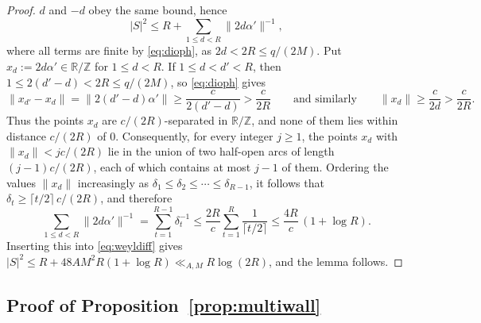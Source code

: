 \documentclass[a4paper,reqno,12pt]{amsart}
\theoremstyle{plain}
\theoremstyle{plain}
\theoremstyle{remark}
\theoremstyle{plain}
\newcommand{\RR}{\mathbb{R}}
\newcommand{\Z}{\mathbb{Z}}
\theoremstyle{plain}
\theoremstyle{plain}
\begin{document}
{\begin{proof}
$d$ and $-d$ obey the same bound, hence
\begin{equation}\label{eq:weyldiff}
|S|^2\leq R+\sum_{1\leq d<R}\|2d\alpha'\|^{-1},
\end{equation}
where all terms are finite by \eqref{eq:dioph}, as $2d<2R\leq q/(2M)$.
Put $x_d:=2d\alpha'\in\RR/\Z$ for $1\leq d<R$. If $1\leq d<d'<R$, then
$1\leq2(d'-d)<2R\leq q/(2M)$, so \eqref{eq:dioph} gives
$$
\|x_{d'}-x_d\|=\|2(d'-d)\alpha'\|\geq\frac{c}{2(d'-d)}>\frac{c}{2R}
\qquad\text{and similarly}\qquad
\|x_d\|\geq\frac{c}{2d}>\frac{c}{2R}.
$$
Thus the points $x_d$ are $c/(2R)$-separated in $\RR/\Z$, and none of them
lies within distance $c/(2R)$ of $0$. Consequently, for every integer
$j\geq1$, the points $x_d$ with $\|x_d\|<jc/(2R)$ lie in the union of two
half-open arcs of length $(j-1)c/(2R)$, each of which contains at most $j-1$
of them. Ordering the values $\|x_d\|$ increasingly as
$\delta_1\leq\delta_2\leq\cdots\leq\delta_{R-1}$, it follows that
$\delta_t\geq\lceil t/2\rceil\,c/(2R)$, and therefore
$$
\sum_{1\leq d<R}\|2d\alpha'\|^{-1}
=\sum_{t=1}^{R-1}\delta_t^{-1}
\leq\frac{2R}{c}\sum_{t=1}^{R}\frac{1}{\lceil t/2\rceil}
\leq\frac{4R}{c}\,(1+\log R).
$$
Inserting this into \eqref{eq:weyldiff} gives
$|S|^2\leq R+48AM^2R(1+\log R)\ll_{A,M}R\log(2R)$, and the lemma follows.
\end{proof}

\subsection{Proof of Proposition~\ref{prop:multiwall}}\label{sec:proofmulti}

}
\end{document}
